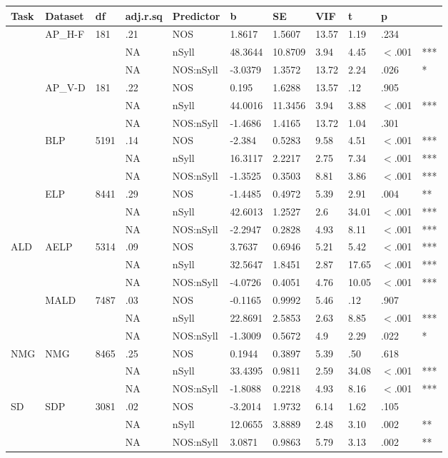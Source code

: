 \begin{table}[ht]
\centering
\begingroup\normalsize
\begin{tabular}{lllllllllll}
  \hline
Task & Dataset & df & adj.r.sq & Predictor & b & SE & VIF & t & p &  \\ 
  \hline
 & AP\_H-F & 181 & .21 & NOS & 1.8617 & 1.5607 & 13.57 & 1.19 & .234 &   \\ 
   &  &  & NA & nSyll & 48.3644 & 10.8709 & 3.94 & 4.45 & $<$.001 & *** \\ 
   &  &  & NA & NOS:nSyll & -3.0379 & 1.3572 & 13.72 & 2.24 & .026 & * \\ 
   & AP\_V-D & 181 & .22 & NOS & 0.195 & 1.6288 & 13.57 & .12 & .905 &   \\ 
   &  &  & NA & nSyll & 44.0016 & 11.3456 & 3.94 & 3.88 & $<$.001 & *** \\ 
   &  &  & NA & NOS:nSyll & -1.4686 & 1.4165 & 13.72 & 1.04 & .301 &   \\ 
   & BLP & 5191 & .14 & NOS & -2.384 & 0.5283 & 9.58 & 4.51 & $<$.001 & *** \\ 
   &  &  & NA & nSyll & 16.3117 & 2.2217 & 2.75 & 7.34 & $<$.001 & *** \\ 
   &  &  & NA & NOS:nSyll & -1.3525 & 0.3503 & 8.81 & 3.86 & $<$.001 & *** \\ 
   & ELP & 8441 & .29 & NOS & -1.4485 & 0.4972 & 5.39 & 2.91 & .004 & ** \\ 
   &  &  & NA & nSyll & 42.6013 & 1.2527 & 2.6 & 34.01 & $<$.001 & *** \\ 
   &  &  & NA & NOS:nSyll & -2.2947 & 0.2828 & 4.93 & 8.11 & $<$.001 & *** \\ 
  ALD & AELP & 5314 & .09 & NOS & 3.7637 & 0.6946 & 5.21 & 5.42 & $<$.001 & *** \\ 
   &  &  & NA & nSyll & 32.5647 & 1.8451 & 2.87 & 17.65 & $<$.001 & *** \\ 
   &  &  & NA & NOS:nSyll & -4.0726 & 0.4051 & 4.76 & 10.05 & $<$.001 & *** \\ 
   & MALD & 7487 & .03 & NOS & -0.1165 & 0.9992 & 5.46 & .12 & .907 &   \\ 
   &  &  & NA & nSyll & 22.8691 & 2.5853 & 2.63 & 8.85 & $<$.001 & *** \\ 
   &  &  & NA & NOS:nSyll & -1.3009 & 0.5672 & 4.9 & 2.29 & .022 & * \\ 
  NMG & NMG & 8465 & .25 & NOS & 0.1944 & 0.3897 & 5.39 & .50 & .618 &   \\ 
   &  &  & NA & nSyll & 33.4395 & 0.9811 & 2.59 & 34.08 & $<$.001 & *** \\ 
   &  &  & NA & NOS:nSyll & -1.8088 & 0.2218 & 4.93 & 8.16 & $<$.001 & *** \\ 
  SD & SDP & 3081 & .02 & NOS & -3.2014 & 1.9732 & 6.14 & 1.62 & .105 &   \\ 
   &  &  & NA & nSyll & 12.0655 & 3.8889 & 2.48 & 3.10 & .002 & ** \\ 
   &  &  & NA & NOS:nSyll & 3.0871 & 0.9863 & 5.79 & 3.13 & .002 & ** \\ 
   \hline
\end{tabular}
\endgroup
\end{table}
